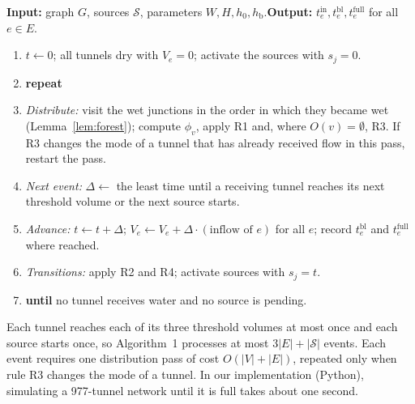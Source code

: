 \documentclass[11pt,a4paper]{article}
\theoremstyle{plain}
\theoremstyle{definition}
\theoremstyle{remark}
\newcommand{\tin}{t^{\mathrm{in}}}
\newcommand{\tbl}{t^{\mathrm{bl}}}
\newcommand{\tfull}{t^{\mathrm{full}}}
\newcommand{\hb}{h_{\mathrm{b}}}
\begin{document}
\begin{tcolorbox}[colback=white, colframe=black!60, boxrule=0.5pt, arc=0pt, left=6pt, right=6pt, top=4pt, bottom=4pt, fontupper=\small,
  title={\small\textbf{Algorithm 1.} Event-driven flood simulation}, coltitle=black, colbacktitle=black!8]
\textbf{Input:} graph $G$, sources $\mathcal{S}$, parameters $W, H, h_0, \hb$.\quad \textbf{Output:} $\tin_e, \tbl_e, \tfull_e$ for all $e \in E$.
\begin{enumerate}[label=\arabic*:, leftmargin=1.8em, itemsep=1pt, topsep=3pt]
  \item $t \gets 0$; all tunnels \textsf{dry} with $V_e = 0$; activate the sources with $s_j = 0$.
  \item \textbf{repeat}
  \item \quad\emph{Distribute:} visit the wet junctions in the order in which they became wet (Lemma~\ref{lem:forest}); compute $\phi_v$, apply R1 and, where $O(v) = \emptyset$, R3. If R3 changes the mode of a tunnel that has already received flow in this pass, restart the pass.
  \item \quad\emph{Next event:} $\Delta \gets$ the least time until a receiving tunnel reaches its next threshold volume or the next source starts.
  \item \quad\emph{Advance:} $t \gets t + \Delta$; $V_e \gets V_e + \Delta \cdot (\text{inflow of } e)$ for all $e$; record $\tbl_e$ and $\tfull_e$ where reached.
  \item \quad\emph{Transitions:} apply R2 and R4; activate sources with $s_j = t$.
  \item \textbf{until} no tunnel receives water and no source is pending.
\end{enumerate}
\end{tcolorbox}

Each tunnel reaches each of its three threshold volumes at most once and each source starts once, so Algorithm~1 processes at most $3|E| + |\mathcal{S}|$ events. Each event requires one distribution pass of cost $O(|V| + |E|)$, repeated only when rule R3 changes the mode of a tunnel. In our implementation (Python), simulating a 977-tunnel network until it is full takes about one second.
\end{document}
